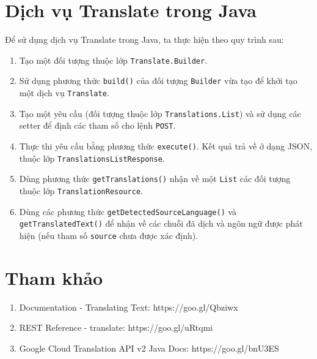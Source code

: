\documentclass[../thesis.tex]{subfiles}
\begin{document}
\section{Dịch vụ Translate trong Java}
Để sử dụng dịch vụ Translate trong Java, ta thực hiện theo quy trình sau:
\begin{enumerate}
  \item Tạo một đối tượng thuộc lớp \lstinline{Translate.Builder}.
  \item Sử dụng phương thức \lstinline{build()} của đối tượng \lstinline{Builder} vừa tạo để khởi tạo một dịch vụ \lstinline{Translate}.
  \item Tạo một yêu cầu (đối tượng thuộc lớp \lstinline{Translations.List}) và sử dụng các setter để định các tham số cho lệnh \lstinline{POST}.
  \item Thực thi yêu cầu bằng phương thức \lstinline{execute()}. Kết quả trả về ở dạng JSON, thuộc lớp \lstinline{TranslationsListResponse}.
  \item Dùng phương thức \lstinline{getTranslations()} nhận về một \lstinline{List} các đối tượng thuộc lớp \lstinline{TranslationResource}.
  \item Dùng các phương thức \lstinline{getDetectedSourceLanguage()} và \lstinline{getTranslatedText()} để nhận về các chuỗi đã dịch và ngôn ngữ được phát hiện (nếu tham số \lstinline{source} chưa được xác định).
\end{enumerate}

\section*{Tham khảo}

\begin{enumerate}
  \item Documentation - Translating Text: https://goo.gl/Qbziwx
  \item REST Reference - translate: https://goo.gl/uRtqmi
  \item Google Cloud Translation API v2 Java Docs: https://goo.gl/bnU3ES
\end{enumerate}
\end{document}
